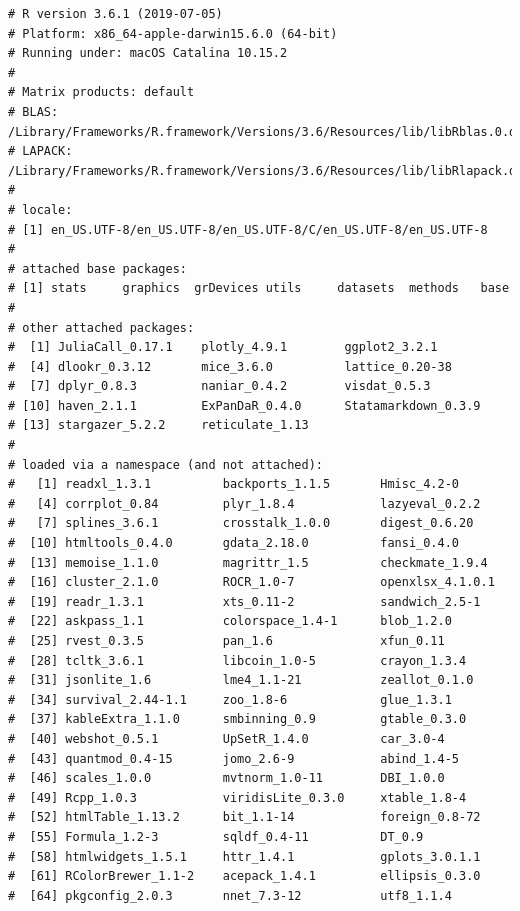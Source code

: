 \documentclass[
  12pt,
]{article}
\begin{document}
\begin{verbatim}
# R version 3.6.1 (2019-07-05) 
# Platform: x86_64-apple-darwin15.6.0 (64-bit) 
# Running under: macOS Catalina 10.15.2 
#  
# Matrix products: default 
# BLAS:   /Library/Frameworks/R.framework/Versions/3.6/Resources/lib/libRblas.0.dylib 
# LAPACK: /Library/Frameworks/R.framework/Versions/3.6/Resources/lib/libRlapack.dylib 
#  
# locale: 
# [1] en_US.UTF-8/en_US.UTF-8/en_US.UTF-8/C/en_US.UTF-8/en_US.UTF-8 
#  
# attached base packages: 
# [1] stats     graphics  grDevices utils     datasets  methods   base      
#  
# other attached packages: 
#  [1] JuliaCall_0.17.1    plotly_4.9.1        ggplot2_3.2.1       
#  [4] dlookr_0.3.12       mice_3.6.0          lattice_0.20-38     
#  [7] dplyr_0.8.3         naniar_0.4.2        visdat_0.5.3        
# [10] haven_2.1.1         ExPanDaR_0.4.0      Statamarkdown_0.3.9 
# [13] stargazer_5.2.2     reticulate_1.13     
#  
# loaded via a namespace (and not attached): 
#   [1] readxl_1.3.1          backports_1.1.5       Hmisc_4.2-0           
#   [4] corrplot_0.84         plyr_1.8.4            lazyeval_0.2.2        
#   [7] splines_3.6.1         crosstalk_1.0.0       digest_0.6.20         
#  [10] htmltools_0.4.0       gdata_2.18.0          fansi_0.4.0           
#  [13] memoise_1.1.0         magrittr_1.5          checkmate_1.9.4       
#  [16] cluster_2.1.0         ROCR_1.0-7            openxlsx_4.1.0.1      
#  [19] readr_1.3.1           xts_0.11-2            sandwich_2.5-1        
#  [22] askpass_1.1           colorspace_1.4-1      blob_1.2.0            
#  [25] rvest_0.3.5           pan_1.6               xfun_0.11             
#  [28] tcltk_3.6.1           libcoin_1.0-5         crayon_1.3.4          
#  [31] jsonlite_1.6          lme4_1.1-21           zeallot_0.1.0         
#  [34] survival_2.44-1.1     zoo_1.8-6             glue_1.3.1            
#  [37] kableExtra_1.1.0      smbinning_0.9         gtable_0.3.0          
#  [40] webshot_0.5.1         UpSetR_1.4.0          car_3.0-4             
#  [43] quantmod_0.4-15       jomo_2.6-9            abind_1.4-5           
#  [46] scales_1.0.0          mvtnorm_1.0-11        DBI_1.0.0             
#  [49] Rcpp_1.0.3            viridisLite_0.3.0     xtable_1.8-4          
#  [52] htmlTable_1.13.2      bit_1.1-14            foreign_0.8-72        
#  [55] Formula_1.2-3         sqldf_0.4-11          DT_0.9                
#  [58] htmlwidgets_1.5.1     httr_1.4.1            gplots_3.0.1.1        
#  [61] RColorBrewer_1.1-2    acepack_1.4.1         ellipsis_0.3.0        
#  [64] pkgconfig_2.0.3       nnet_7.3-12           utf8_1.1.4            

\end{verbatim}
\end{document}
